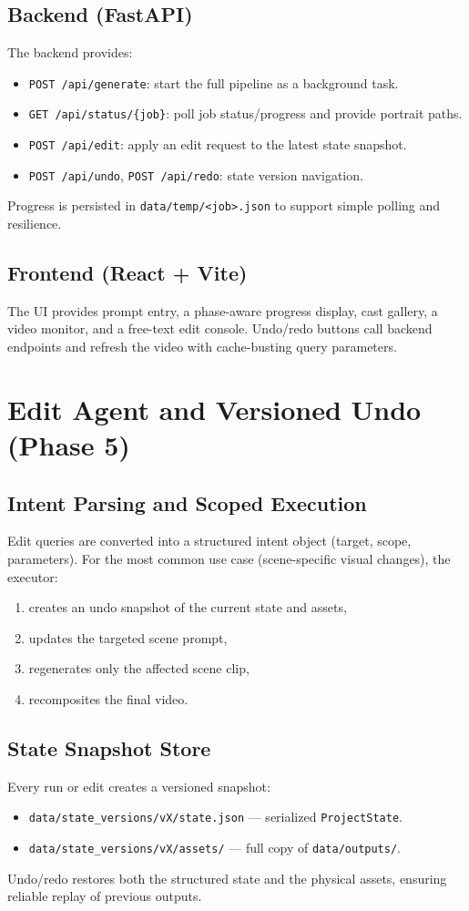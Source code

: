\documentclass[runningheads]{llncs}
\begin{document}
\subsection{Backend (FastAPI)}
The backend provides:
\begin{itemize}
  \item \texttt{POST /api/generate}: start the full pipeline as a background task.
  \item \texttt{GET /api/status/\{job\}}: poll job status/progress and provide portrait paths.
  \item \texttt{POST /api/edit}: apply an edit request to the latest state snapshot.
  \item \texttt{POST /api/undo}, \texttt{POST /api/redo}: state version navigation.
\end{itemize}
Progress is persisted in \texttt{data/temp/<job>.json} to support simple polling and resilience.

\subsection{Frontend (React + Vite)}
The UI provides prompt entry, a phase-aware progress display, cast gallery, a video monitor, and a free-text edit console. Undo/redo buttons call backend endpoints and refresh the video with cache-busting query parameters.

\section{Edit Agent and Versioned Undo (Phase 5)}
\subsection{Intent Parsing and Scoped Execution}
Edit queries are converted into a structured intent object (target, scope, parameters). For the most common use case (scene-specific visual changes), the executor:
\begin{enumerate}
  \item creates an undo snapshot of the current state and assets,
  \item updates the targeted scene prompt,
  \item regenerates only the affected scene clip,
  \item recomposites the final video.
\end{enumerate}

\subsection{State Snapshot Store}
Every run or edit creates a versioned snapshot:
\begin{itemize}
  \item \texttt{data/state\_versions/vX/state.json} --- serialized \texttt{ProjectState}.
  \item \texttt{data/state\_versions/vX/assets/} --- full copy of \texttt{data/outputs/}.
\end{itemize}
Undo/redo restores both the structured state and the physical assets, ensuring reliable replay of previous outputs.
\end{document}
